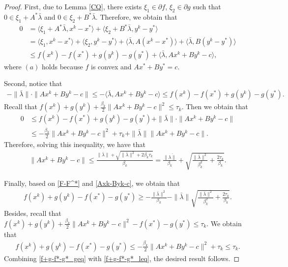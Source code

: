 \documentclass{article}
\numberwithin{equation}{section}
\begin{document}
\begin{proof}
    First, due to Lemma \ref{CQ}, there exists $\xi_1 \in \partial f$, $\xi_2\in \partial g$ such that 
    $0 \in \xi_1 + A^*\bar{\lambda}$ and $0\in \xi_2+B^*\bar{\lambda}$.
    Therefore, we obtain that 
    \begin{align}
        0&= \langle \xi_1+A^*\bar{\lambda}, x^k -x^*\rangle+ \langle \xi_2+B^*\bar{\lambda}, y^k-y^*\rangle \nonumber \\
        & =\langle \xi_1, x^k -x^* \rangle +\langle \xi_2, y^k -y^*\rangle +\langle \bar{\lambda}, A(x^k-x^*) \rangle +\langle \bar{\lambda}, B(y^k-y^*) \rangle \nonumber \\
        &\overset{\mathop{(a)}}{\leq} f(x^k) -f(x^*) + g(y^k) -g(y^*) + \langle \bar{\lambda}, Ax^k+By^k-c\rangle, \nonumber
    \end{align}
    where $(a)$ holds because $f$ is convex 
    and $Ax^* + By^* = c$. 
    
    Second, notice that 
    \begin{align}
       -\|\bar{\lambda}\rVert \cdot\|Ax^k+By^k-c\rVert\leq -\langle \bar{\lambda}, Ax^k+By^k-c\rangle \leq f(x^k) -f(x^*) + g(y^k) -g(y^*). \label{F-F^*}
    \end{align}
    Recall that $f(x^k)+ g(y^k)+\frac{\beta_k}{2}\|Ax^k+By^k-c\rVert^2\leq \tau_k$. Then we obtain that 
    \begin{align}
        0&\leq f(x^k) -f(x^*) + g(y^k) -g(y^*) + \|\bar{\lambda}\rVert \cdot \|Ax^k+By^k-c\rVert \nonumber \\
        & \leq -\frac{\beta_k}{2}\|Ax^k+By^k-c\|^2 + \tau_k +\|\bar{\lambda}\rVert\|Ax^k+By^k-c\|. \nonumber
    \end{align}
    Therefore, solving this inequality, we have that 
    \begin{align}
        \|Ax^k+By^k-c\rVert \leq \frac{\|\bar{\lambda}\rVert+\sqrt{\|\bar{\lambda}\rVert^2+2\beta_k\tau_k}}{\beta_k}
        =\frac{\|\bar{\lambda\rVert}}{\beta_k}+\sqrt{\frac{\|\bar{\lambda}\rVert^2}{\beta_k^2}+\frac{2\tau_k}{\beta_k}}. \label{Axk-Byk-c}
    \end{align}

    Finally, based on \eqref{F-F^*} and \eqref{Axk-Byk-c}, we obtain that 
    \begin{align}
        f(x^k) + g(y^k) -f(x^*)- g(y^*) \geq -\frac{\|\bar{\lambda}\rVert^2}{\beta_k}- \|\bar{\lambda}\rVert\sqrt{\frac{\|\bar{\lambda}\rVert^2}{\beta_k^2}+\frac{2\tau_k}{\beta_k}}. 
        \label{f+g-f*-g*_geq}
    \end{align}
    Besides, recall that $f(x^k)+ g(y^k)+\frac{\beta_k}{2}\|Ax^k+By^k-c\rVert^2 -f(x^*)-g(y^*)\leq \tau_k$. 
    We obtain that 
    \begin{align}
        f(x^k)+ g(y^k) -f(x^*)-g(y^*)\leq -\frac{\beta_k}{2}\|Ax^k+By^k-c\rVert^2+ \tau_k \leq \tau_k.   
        \label{f+g-f*-g*_leq}
    \end{align}
    Combining \eqref{f+g-f*-g*_geq} with \eqref{f+g-f*-g*_leq}, the desired result follows. 
\end{proof}
\end{document}
